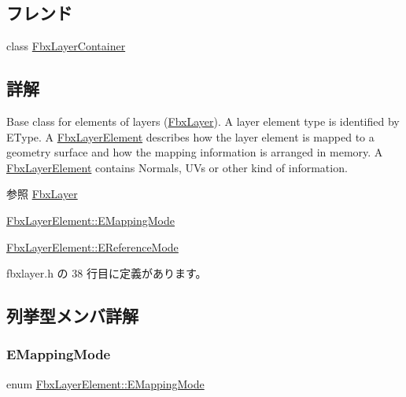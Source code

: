 \subsection*{フレンド}
\begin{DoxyCompactItemize}
\item 
class \hyperlink{class_fbx_layer_element_a791d2046ce60bf6f5fb85d9dc6242f2e}{Fbx\+Layer\+Container}
\end{DoxyCompactItemize}


\subsection{詳解}
Base class for elements of layers (\hyperlink{class_fbx_layer}{Fbx\+Layer}). A layer element type is identified by E\+Type. A \hyperlink{class_fbx_layer_element}{Fbx\+Layer\+Element} describes how the layer element is mapped to a geometry surface and how the mapping information is arranged in memory. A \hyperlink{class_fbx_layer_element}{Fbx\+Layer\+Element} contains Normals, U\+Vs or other kind of information.

\begin{DoxySeeAlso}{参照}
\hyperlink{class_fbx_layer}{Fbx\+Layer} 

\hyperlink{class_fbx_layer_element_a5a40e95db30ae9f94611dc3f1568af26}{Fbx\+Layer\+Element\+::\+E\+Mapping\+Mode} 

\hyperlink{class_fbx_layer_element_a00f04654580ca9b2f5d292c11abd83fc}{Fbx\+Layer\+Element\+::\+E\+Reference\+Mode} 
\end{DoxySeeAlso}


 fbxlayer.\+h の 38 行目に定義があります。



\subsection{列挙型メンバ詳解}
\mbox{\label{class_fbx_layer_element_a5a40e95db30ae9f94611dc3f1568af26}} 
\subsubsection{\texorpdfstring{E\+Mapping\+Mode}{EMappingMode}}
{\footnotesize\ttfamily enum \hyperlink{class_fbx_layer_element_a5a40e95db30ae9f94611dc3f1568af26}{Fbx\+Layer\+Element\+::\+E\+Mapping\+Mode}}


